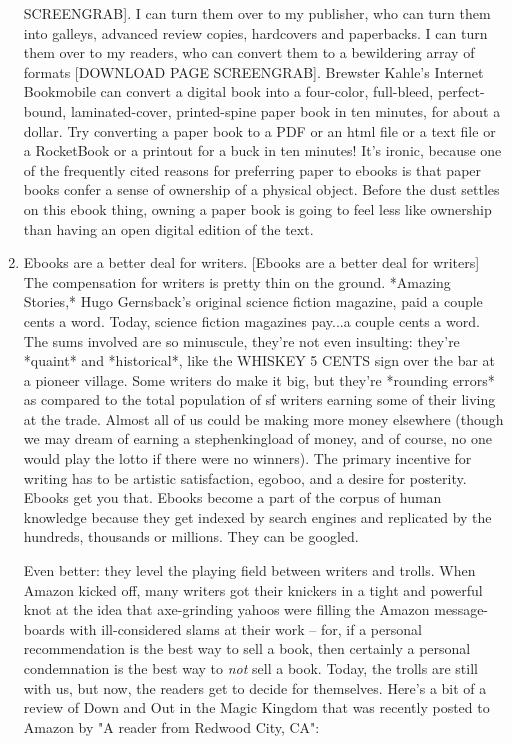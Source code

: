 \begin{enumerate}
  SCREENGRAB]. I can turn them over to my publisher, who can turn
  them into galleys, advanced review copies, hardcovers and
  paperbacks. I can turn them over to my readers, who can convert
  them to a bewildering array of formats [DOWNLOAD PAGE SCREENGRAB].
  Brewster Kahle's Internet Bookmobile can convert a digital book
  into a four-color, full-bleed, perfect-bound, laminated-cover,
  printed-spine paper book in ten minutes, for about a dollar. Try
  converting a paper book to a PDF or an html file or a text file or
  a RocketBook or a printout for a buck in ten minutes! It's ironic,
  because one of the frequently cited reasons for preferring paper to
  ebooks is that paper books confer a sense of ownership of a
  physical object. Before the dust settles on this ebook thing,
  owning a paper book is going to feel less like ownership than
  having an open digital edition of the text.
\item
  Ebooks are a better deal for writers. [Ebooks are a better deal for
  writers] The compensation for writers is pretty thin on the ground.
  *Amazing Stories,* Hugo Gernsback's original science fiction
  magazine, paid a couple cents a word. Today, science fiction
  magazines pay...a couple cents a word. The sums involved are so
  minuscule, they're not even insulting: they're *quaint* and
  *historical*, like the WHISKEY 5 CENTS sign over the bar at a
  pioneer village. Some writers do make it big, but they're *rounding
  errors* as compared to the total population of sf writers earning
  some of their living at the trade. Almost all of us could be making
  more money elsewhere (though we may dream of earning a
  stephenkingload of money, and of course, no one would play the
  lotto if there were no winners). The primary incentive for writing
  has to be artistic satisfaction, egoboo, and a desire for
  posterity. Ebooks get you that. Ebooks become a part of the corpus
  of human knowledge because they get indexed by search engines and
  replicated by the hundreds, thousands or millions. They can be
  googled.
  
  Even better: they level the playing field between writers and
  trolls. When Amazon kicked off, many writers got their knickers in
  a tight and powerful knot at the idea that axe-grinding yahoos were
  filling the Amazon message-boards with ill-considered slams at
  their work -- for, if a personal recommendation is the best way to
  sell a book, then certainly a personal condemnation is the best way
  to \emph{not} sell a book. Today, the trolls are still with us,
  but now, the readers get to decide for themselves. Here's a bit of
  a review of Down and Out in the Magic Kingdom that was recently
  posted to Amazon by "A reader from Redwood City, CA":
  

\end{enumerate}
